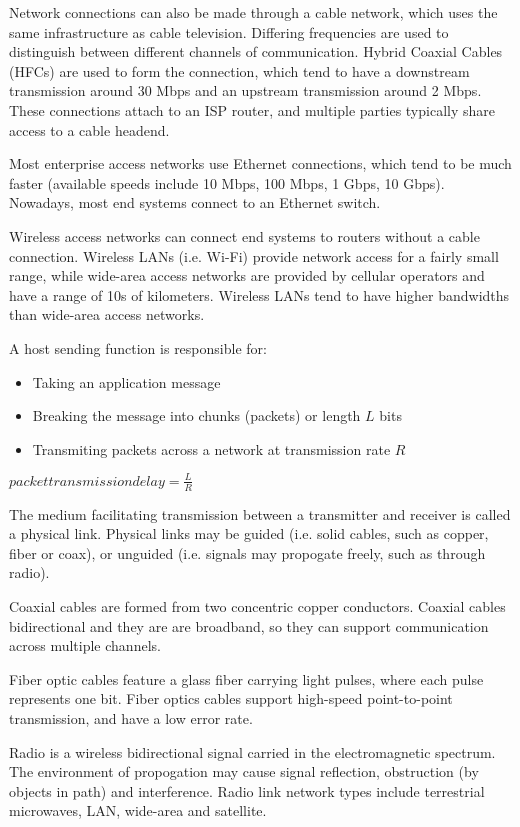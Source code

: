 \documentclass[12pt,titlepage]{article}
\begin{document}
      Network connections can also be made through a cable network, which uses the same infrastructure as cable television.
      Differing frequencies are used to distinguish between different channels of communication. Hybrid Coaxial Cables (HFCs) are
      used to form the connection, which tend to have a downstream transmission around 30 Mbps and an upstream transmission around
      2 Mbps. These connections attach to an ISP router, and multiple parties typically share access to a cable headend.

      Most enterprise access networks use Ethernet connections, which tend to be much faster (available speeds include 10 Mbps, 100 Mbps,
      1 Gbps, 10 Gbps). Nowadays, most end systems connect to an Ethernet switch.

      Wireless access networks can connect end systems to routers without a cable connection. Wireless LANs (i.e. Wi-Fi) provide network
      access for a fairly small range, while wide-area access networks are provided by cellular operators and have a range of 10s of
      kilometers. Wireless LANs tend to have higher bandwidths than wide-area access networks.

      A host sending function is responsible for:
        \begin{itemize}
          \item Taking an application message
          \item Breaking the message into chunks (packets) or length $L$ bits
          \item Transmiting packets across a network at transmission rate $R$
        \end{itemize}
    $packet transmission delay = \frac{L}{R}$

    The medium facilitating transmission between a transmitter and receiver is called a physical link. Physical links may be guided
    (i.e. solid cables, such as copper, fiber or coax), or unguided (i.e. signals may propogate freely, such as through radio).

    Coaxial cables are formed from two concentric copper conductors. Coaxial cables bidirectional and they are are broadband, so they
    can support communication across multiple channels.

    Fiber optic cables feature a glass fiber carrying light pulses, where each pulse represents one bit. Fiber optics cables support
    high-speed point-to-point transmission, and have a low error rate.

    Radio is a wireless bidirectional signal carried in the electromagnetic spectrum. The environment of propogation may cause signal
    reflection, obstruction (by objects in path) and interference. Radio link network types include terrestrial microwaves, LAN, wide-area
    and satellite.
\end{document}
